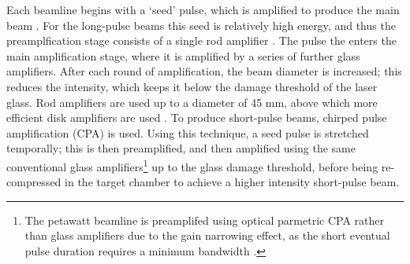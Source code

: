 Each beamline begins with a `seed' pulse, which is amplified to produce the main beam \cite{Ross1981}. For the long-pulse beams this seed is relatively high energy, and thus the preamplfication stage consists of a single rod amplifier \cite{Springate2010}. The pulse the enters the main amplification stage, where it is amplified by a series of further glass amplifiers. After each round of amplification, the beam diameter is increased; this reduces the intensity, which keeps it below the damage threshold of the laser glass. Rod amplifiers are used up to a diameter of 45 \unit{\milli\meter}, above which more efficient disk amplifiers are used \cite{Springate2010}. To produce short-pulse beams, chirped pulse amplification (CPA) \cite{Strickland1985} is used. Using this technique, a seed pulse is stretched temporally; this is then preamplified, and then amplified using the same conventional glass amplifiers\footnote{The petawatt beamline is preamplifed using optical parmetric CPA \cite{Ross1997,Hernandez-Gomez2006, Musgrave2015} rather than glass amplifiers due to the gain narrowing effect, as the short eventual pulse duration requires a minimum bandwidth \cite{Danson2004}.} up to the glass damage threshold, before being re-compressed in the target chamber to achieve a higher intensity short-pulse beam. 



